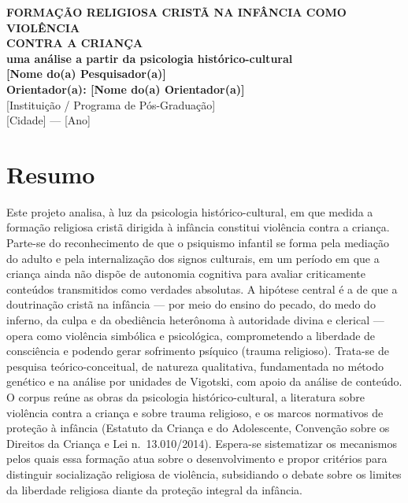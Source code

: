 \documentclass[
    a4paper,
    12pt,
    oneside,
    section=TITLE,
    brazilian,
    english
]{abntex2}
\begin{document}
\begin{center}
    {\large\textbf{FORMAÇÃO RELIGIOSA CRISTÃ NA INFÂNCIA COMO VIOLÊNCIA\\CONTRA A CRIANÇA}}\\[0.75em]
    {\large\textbf{uma análise a partir da psicologia histórico-cultural}}\\[2em]

    \textbf{[Nome do(a) Pesquisador(a)]}\\[0.5em]
    \textbf{Orientador(a): [Nome do(a) Orientador(a)]}\\[1.5em]

    [Instituição / Programa de Pós-Graduação]\\[1.5em]

    [Cidade] --- [Ano]
\end{center}

\vspace{1em}

\section*{Resumo}

Este projeto analisa, à luz da psicologia histórico-cultural, em que medida a formação religiosa cristã dirigida à infância constitui violência contra a criança. Parte-se do reconhecimento de que o psiquismo infantil se forma pela mediação do adulto e pela internalização dos signos culturais, em um período em que a criança ainda não dispõe de autonomia cognitiva para avaliar criticamente conteúdos transmitidos como verdades absolutas. A hipótese central é a de que a doutrinação cristã na infância --- por meio do ensino do pecado, do medo do inferno, da culpa e da obediência heterônoma à autoridade divina e clerical --- opera como violência simbólica e psicológica, comprometendo a liberdade de consciência e podendo gerar sofrimento psíquico (trauma religioso). Trata-se de pesquisa teórico-conceitual, de natureza qualitativa, fundamentada no método genético e na análise por unidades de Vigotski, com apoio da análise de conteúdo. O corpus reúne as obras da psicologia histórico-cultural, a literatura sobre violência contra a criança e sobre trauma religioso, e os marcos normativos de proteção à infância (Estatuto da Criança e do Adolescente, Convenção sobre os Direitos da Criança e Lei n.~13.010/2014). Espera-se sistematizar os mecanismos pelos quais essa formação atua sobre o desenvolvimento e propor critérios para distinguir socialização religiosa de violência, subsidiando o debate sobre os limites da liberdade religiosa diante da proteção integral da infância.
\end{document}
